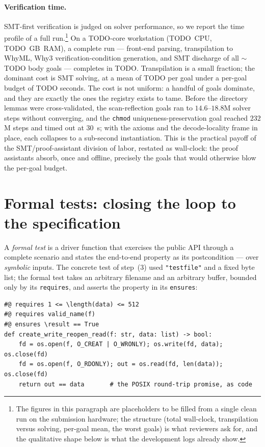 \documentclass[11pt]{article}
\newcommand{\whyml}{\textsf{WhyML}}
\newcommand{\why}{\textsf{Why3}}
\begin{document}
\paragraph{Verification time.}
SMT-first verification is judged on solver performance, so we report the time
profile of a full run.\footnote{The figures in this paragraph are placeholders
to be filled from a single clean run on the submission hardware; the structure
(total wall-clock, transpilation versus solving, per-goal mean, the worst
goals) is what reviewers ask for, and the qualitative shape below is what the
development logs already show.} On a TODO-core workstation (TODO~CPU,
TODO~GB~RAM), a complete run --- front-end parsing, transpilation to \whyml{},
\why{} verification-condition generation, and SMT discharge of all
$\sim$\,TODO body goals --- completes in TODO. Transpilation is a small
fraction; the dominant cost is SMT solving, at a mean of TODO per goal under a
per-goal budget of TODO seconds. The cost is not uniform: a handful of goals
dominate, and they are exactly the ones the registry exists to tame. Before the
directory lemmas were cross-validated, the scan-reflection goals ran to
$14.6$--$18.8$M solver steps without converging, and the \texttt{chmod}
uniqueness-preservation goal reached $232$M steps and timed out at $30$~s; with
the axioms and the decode-locality frame in place, each collapses to a
sub-second instantiation. This is the practical payoff of the SMT/proof-assistant
division of labor, restated as wall-clock: the proof assistants absorb, once and
offline, precisely the goals that would otherwise blow the per-goal budget.

\section{Formal tests: closing the loop to the specification}
\label{sec:formaltests}

A \emph{formal test} is a driver function that exercises the public API
through a complete scenario and states the end-to-end property as its
postcondition --- over \emph{symbolic} inputs. The concrete test of step~(3)
used \texttt{"testfile"} and a fixed byte list; the formal test takes an
arbitrary filename and an arbitrary buffer, bounded only by its
\texttt{requires}, and asserts the property in its \texttt{ensures}:

\begin{lstlisting}
#@ requires 1 <= \length(data) <= 512
#@ requires valid_name(f)
#@ ensures \result == True
def create_write_reopen_read(f: str, data: list) -> bool:
    fd = os.open(f, O_CREAT | O_WRONLY); os.write(fd, data); os.close(fd)
    fd = os.open(f, O_RDONLY); out = os.read(fd, len(data)); os.close(fd)
    return out == data       # the POSIX round-trip promise, as code
\end{lstlisting}
\end{document}

